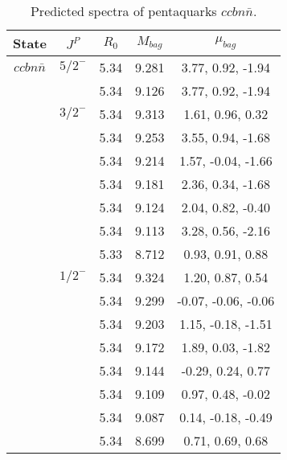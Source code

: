 \documentclass[prd,twocolumn,floatfix,nofootinbib]{revtex4}
\begin{document}
\renewcommand{\tabcolsep}{0.5cm}
\renewcommand{\arraystretch}{1.2}
\begin{table*}[!htbp]
    \caption{Predicted spectra of pentaquarks $ccbn\bar{n}$.}
    \begin{tabular}{ccccc}
        \hline\hline
        {\rm State} &$J^{P}$ &$R_{0}$ &$M_{bag}$ &$\mu_{bag}$ \\ \hline
        ${ccbn\bar{n}}$
            &${5/2}^{-}$    &5.34   &9.281  &3.77, 0.92, -1.94 \\
            &               &5.34   &9.126  &3.77, 0.92, -1.94 \\
            &${3/2}^{-}$    &5.34   &9.313  &1.61, 0.96, 0.32 \\
            &               &5.34   &9.253  &3.55, 0.94, -1.68 \\
            &               &5.34   &9.214  &1.57, -0.04, -1.66 \\
            &               &5.34   &9.181  &2.36, 0.34, -1.68 \\
            &               &5.34   &9.124  &2.04, 0.82, -0.40 \\
            &               &5.34   &9.113  &3.28, 0.56, -2.16 \\
            &               &5.33   &8.712  &0.93, 0.91, 0.88 \\
            &${1/2}^{-}$    &5.34   &9.324  &1.20, 0.87, 0.54 \\
            &               &5.34   &9.299  &-0.07, -0.06, -0.06 \\
            &               &5.34   &9.203  &1.15, -0.18, -1.51 \\
            &               &5.34   &9.172  &1.89, 0.03, -1.82 \\
            &               &5.34   &9.144  &-0.29, 0.24, 0.77 \\
            &               &5.34   &9.109  &0.97, 0.48, -0.02 \\
            &               &5.34   &9.087  &0.14, -0.18, -0.49 \\
            &               &5.34   &8.699  &0.71, 0.69, 0.68 \\

        \hline\hline
    \end{tabular}
\end{table*}
\end{document}
